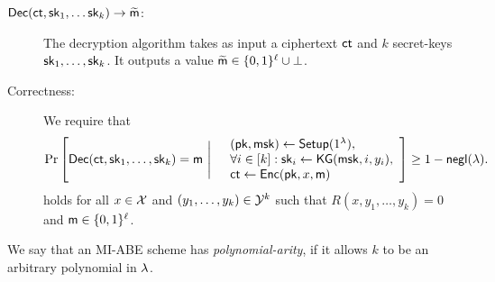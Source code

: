 \begin{definition}
\begin{description}
\item[$\mathsf{Dec}(\mathsf{ct}, \mathsf{sk}_1, \ldots \mathsf{sk}_k)\rightarrow \widetilde{\mathsf{m}}$:]
The decryption algorithm takes as input a ciphertext $\mathsf{ct}$ and $k$
secret-keys $\mathsf{sk}_1, \ldots, \mathsf{sk}_k$. It outputs a value
$\widetilde{\mathsf{m}} \in \{0,1\}^\ell \cup \bot$.

\item[Correctness:] We require that
\[
\Pr\left[
\mathsf{Dec}(\mathsf{ct}, \mathsf{sk}_1, \ldots, \mathsf{sk}_k) = \mathsf{m}
 \ \Bigg\lvert
\begin{array}{rl}
 &(\mathsf{pk},\mathsf{msk}) \leftarrow \mathsf{Setup}(1^\lambda),\\
 & \forall i \in [k]: \mathsf{sk}_i \leftarrow \mathsf{KG}(\mathsf{msk},i,y_i), \\
 &\mathsf{ct} \leftarrow \mathsf{Enc}(\mathsf{pk},x,\mathsf{m})
\end{array}
\right] \ge 1 -{\mathsf{negl}}(\lambda).
\]
holds for all $x\in \mathcal{X}$ and $(y_1, \ldots, y_k) \in \mathcal{Y}^k$ such
that $R(x,y_1,\ldots,y_k)=0$ and $\mathsf{m}\in \{0,1\}^\ell$.
\end{description}

\begin{remark}
We say that an MI-ABE scheme has \emph{polynomial-arity}, if it
allows $k$ to be an arbitrary polynomial in $\lambda$.
\end{remark}

%
\end{definition}

